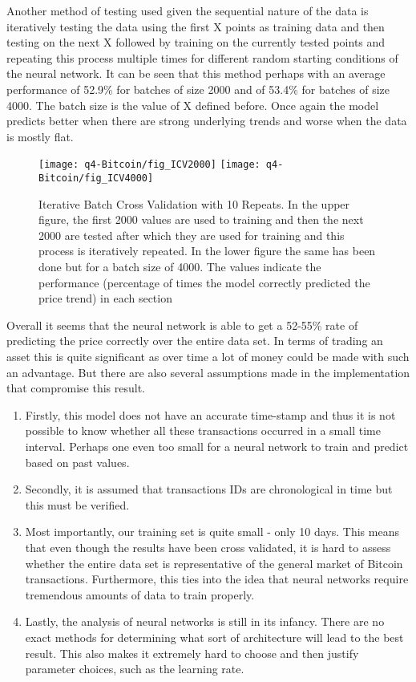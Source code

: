 \documentclass{article}
\begin{document}
Another method of testing used given the sequential nature of the data is iteratively testing the data using the first X points as training data and then testing on the next X followed by training on the currently tested points and repeating this process multiple times for different random starting conditions of the neural network. It can be seen that this method perhaps with an average performance of 52.9\% for batches of size 2000 and of 53.4\% for batches of size 4000. The batch size is the value of X defined before. Once again the model predicts better when there are strong underlying trends and worse when the data is mostly flat. 

\begin{figure}[h!]
		\centering
		\texttt{[image: q4-Bitcoin/fig\_ICV2000]}
			\texttt{[image: q4-Bitcoin/fig\_ICV4000]}
		\caption{Iterative Batch Cross Validation with 10 Repeats. In the upper figure, the first 2000 values are used to training and then the next 2000 are tested after which they are used for training and this process is iteratively repeated. In the lower figure the same has been done but for a batch size of 4000. The values indicate the performance (percentage of times the model correctly predicted the price trend) in each section}
		\label{fig:ICV}
\end{figure}

Overall it seems that the neural network is able to get a 52-55\% rate of predicting the price correctly over the entire data set. In terms of trading an asset this is quite significant as over time a lot of money could be made with such an advantage. But there are also several assumptions made in the implementation that compromise this result. 
\begin{enumerate}
	\item Firstly, this model does not have an accurate time-stamp and thus it is not possible to know whether all these transactions occurred in a small time interval. Perhaps one even too small for a neural network to train and predict based on past values.
	\item Secondly, it is assumed that transactions IDs are chronological in time but this must be verified.
	\item Most importantly, our training set is quite small - only 10 days. This means that even though the results have been cross validated, it is hard to assess whether the entire data set is representative of the general market of Bitcoin transactions. Furthermore, this ties into the idea that neural networks require tremendous amounts of data to train properly.
	\item Lastly, the analysis of neural networks is still in its infancy. There are no exact methods for determining what sort of architecture will lead to the best result. This also makes it extremely hard to choose and then justify parameter choices, such as the learning rate.
\end{enumerate}
\end{document}

